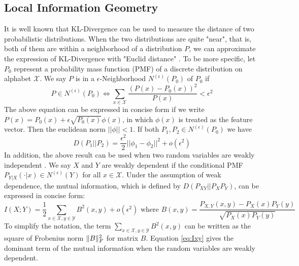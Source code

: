 \subsection{Local Information Geometry}\label{subsec:lig}
It is well known that KL-Divergence can be used to measure the distance of two probabilistic distributions. When the two distributions are quite "near", that is, both of them are within a neighborhood of a distribution $P$, we can approximate the expression of KL-Divergence with "Euclid distance" \citep{huang2017information}. To be more specific, let $P_0$ represent a probability mass function (PMF) of a discrete distribution on alphabet $\mathcal{X}$. We say $P$ is in a $\epsilon$-Neighborhood $N^{(\epsilon)}(P_0)$ of $P_0$ if
\begin{equation}
P \in N^{(\epsilon)}(P_0) \iff \sum_{x \in \mathcal{X}} \frac{(P(x) - P_0(x))^2}{P(x)} < \epsilon^2
\end{equation}
The above equation can be expressed in concise form if we write $P(x) = P_0(x) + \epsilon
\sqrt{P_0(x)} \phi(x)$, in which $\phi(x)$ is treated as the feature vector. Then the euclidean norm $||\phi || < 1$.
If both $P_1, P_2 \in N^{(\epsilon)}(P_0)$ we have
\begin{equation}\label{eq:approx:ig}
D(P_1 || P_2) = \frac{\epsilon^2}{2} ||\phi_1 - \phi_2||^2 + o(\epsilon^2)
\end{equation}
In addition, the above result can be used when two random variables are weakly independent \citep{huang2019universal}. We say $X$ and $Y$ are weakly dependent if the conditional PMF $P_{Y|X}(\cdot |x) \in N^{(\epsilon)}(Y)$ for all $x \in \mathcal{X}$. Under the assumption of
weak dependence, the mutual information, which is defined by $D(P_{XY}||P_XP_Y)$, can be expressed
in concise form:
\begin{equation}\label{eq:Ixy}
I(X;Y) = \frac{1}{2}\sum_{x\in \mathcal{X}, y\in \mathcal{Y}} B^2(x,y) + o(\epsilon^2) \textrm{ where }  B(x,y)=\frac{P_{X,Y}(x,y) - P_X(x) P_Y(y)}{\sqrt{P_X(x)P_Y(y)}}
\end{equation}
To simplify the notation, the term $\sum_{x\in \mathcal{X}, y\in \mathcal{Y}} B^2(x,y)$ can be written as the square of Frobenius norm $\lVert B\rVert_F^2$ for matrix $B$. Equation \eqref{eq:Ixy} gives the dominant term
of the mutual information when the random variables are weakly dependent.

